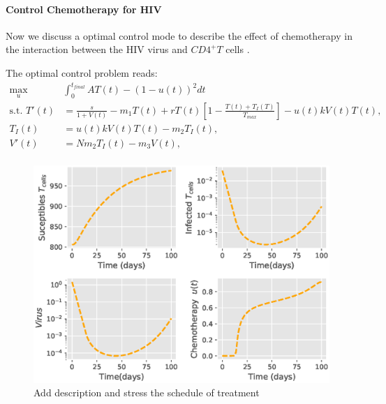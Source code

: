 \paragraph{Control Chemotherapy for HIV} 
	Now we discuss a optimal control mode to describe the effect of chemotherapy
in the interaction between the HIV virus and $CD4^+T$ cells 
\cite{butler1997optimal}.


The optimal control problem reads:
\begin{equation}
	\begin{aligned}
		\max_{u} & \int_{0}^{t_{final}}
			A  T(t) - (1-u(t)) ^ 2 dt
		\\
		\text{s.t. }
			T'(t) &=
				\frac{s}{1 + V(t)}
				- m_1 T(t) 
				+ r T(t)
				\left[
					1 - \frac{T(t)+ T_{I}(T)}{T_{max}}
				\right] 
				- u(t) k V(t) T(t),
			\\
			T_{I}(t) &=
				u(t) k V(t) T(t) - m_2 T_{I}(t),
			\\
			V'(t) &= N m_2 T_{I}(t) - m_3 V(t),
			\\
	\end{aligned}
\end{equation}

\begin{figure}[tbh]
\centering
	\includegraphics[width=0.7\linewidth]{Figures/hiv_chemotherapy_fig_01}
	\caption{Add description and stress the schedule of treatment}
	\label{fig:hivchemotherapyfig01}
\end{figure}

